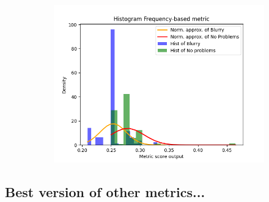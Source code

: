\begin{figure}[H]
\begin{subfigure}[t]{0.48\textwidth}
        \caption{}
        \label{fig:HF_thresh}
    \end{subfigure}\hspace{1em}
    \begin{subfigure}[t]{0.48\textwidth}
        \includegraphics[width=\textwidth]{Figures/BlurredImages/results_on_thresholds/output_dens_hf.png}
        \caption{}
        \label{fig:HF_dens}
    \end{subfigure}\hspace{1em}
    \caption{}
    \label{fig:HF_final}
\end{figure}

\subsection{Best version of other metrics...}

